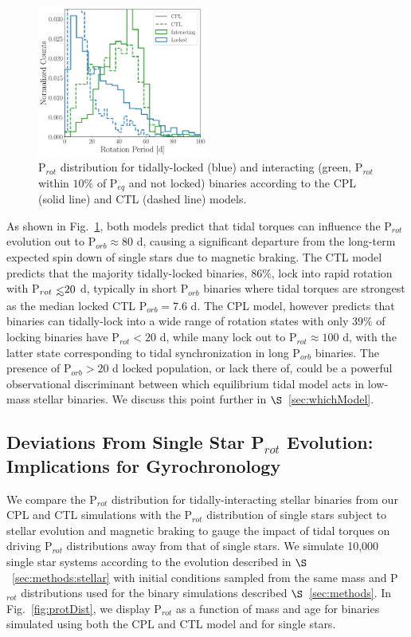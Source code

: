 \documentclass[twocolumn]{aastex61}
\def\lsim{~\rlap{$<$}{\lower 1.0ex\hbox{$\sim$}}}
\begin{document}
\begin{figure}
	\includegraphics[width=0.5\textwidth]{../Plots/lockedProtHist.pdf}
   \caption{P$_{rot}$ distribution for tidally-locked (blue) and interacting (green, P$_{rot}$ within $10\%$ of P$_{eq}$ and not locked) binaries according to the CPL (solid line) and CTL (dashed line) models.}%
    \label{fig:lockedProtHist}%
\end{figure}

As shown in Fig.~\ref{fig:lockedProtHist}, both models predict that tidal torques can influence the P$_{rot}$ evolution out to P$_{orb} \approx 80$ d, causing a significant departure from the long-term expected spin down of single stars due to magnetic braking.  The CTL model predicts that the majority tidally-locked binaries, $86\%$, lock into rapid rotation with P$_{rot} \lsim 20$ d, typically in short P$_{orb}$ binaries where tidal torques are strongest as the median locked CTL P$_{orb} = 7.6$ d. The CPL model, however predicts that binaries can tidally-lock into a wide range of rotation states with only $39\%$ of locking binaries have P$_{rot} < 20$ d, while many lock out to P$_{rot} \approx 100$ d, with the latter state corresponding to tidal synchronization in long P$_{orb}$ binaries.  The presence of P$_{orb} > 20$ d locked population, or lack there of, could be a powerful observational discriminant between which equilibrium tidal model acts in low-mass stellar binaries.  We discuss this point further in $\S$~\ref{sec:whichModel}.

\subsection{Deviations From Single Star P$_{rot}$ Evolution: Implications for Gyrochronology} \label{sec:gyro}

We compare the P$_{rot}$ distribution for tidally-interacting stellar binaries from our CPL and CTL simulations with the P$_{rot}$ distribution of single stars subject to stellar evolution and magnetic braking to gauge the impact of tidal torques on driving P$_{rot}$ distributions away from that of single stars.  We simulate 10,000 single star systems according to the evolution described in $\S$~\ref{sec:methods:stellar} with initial conditions sampled from the same mass and P$_{rot}$ distributions used for the binary simulations described $\S$~\ref{sec:methods}. In Fig.~\ref{fig:protDist}, we display P$_{rot}$ as a function of mass and age for binaries simulated using both the CPL and CTL model and for single stars.
\end{document}
